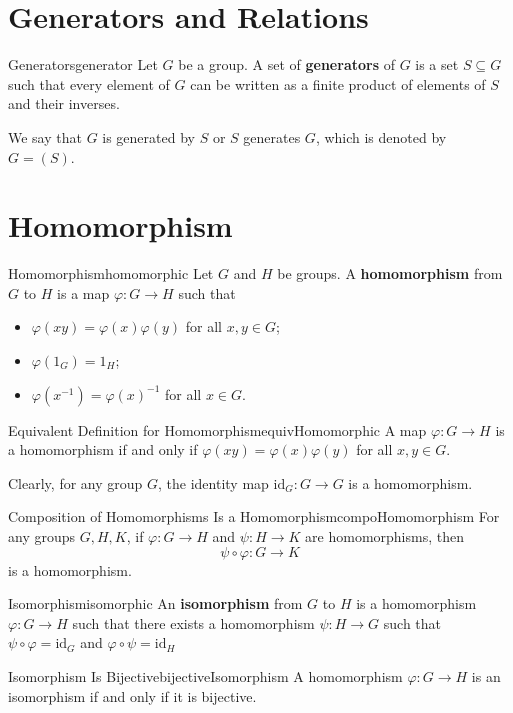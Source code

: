 \documentclass[math, code]{amznotes}
\theoremstyle{remark}
\begin{document}
\section{Generators and Relations}
\begin{dfnbox}{Generators}{generator}
    Let $G$ be a group. A set of {\color{red} \textbf{generators}} of $G$ is a set $S \subseteq G$ such that every element of $G$ can be written as a finite product of elements of $S$ and their inverses.
\end{dfnbox}
We say that $G$ is generated by $S$ or $S$ generates $G$, which is denoted by $G = (S)$.

\section{Homomorphism}
\begin{dfnbox}{Homomorphism}{homomorphic}
    Let $G$ and $H$ be groups. A {\color{red} \textbf{homomorphism}} from $G$ to $H$ is a map $\varphi \colon G \to H$ such that 
    \begin{itemize}
        \item $\varphi(xy) = \varphi(x)\varphi(y)$ for all $x, y \in G$;
        \item $\varphi(1_G) = 1_H$;
        \item $\varphi(x^{-1}) = \varphi(x)^{-1}$ for all $x \in G$.
    \end{itemize}
\end{dfnbox}
\begin{probox}{Equivalent Definition for Homomorphism}{equivHomomorphic}
    A map $\varphi \colon G \to H$ is a homomorphism if and only if $\varphi(xy) = \varphi(x)\varphi(y)$ for all $x, y \in G$.
\end{probox}
Clearly, for any group $G$, the identity map $\mathrm{id}_G\colon G \to G$ is a homomorphism.
\begin{probox}{Composition of Homomorphisms Is a Homomorphism}{compoHomomorphism}
    For any groups $G, H, K$, if $\varphi \colon G \to H$ and $\psi \colon H \to K$ are homomorphisms, then
    \begin{equation*}
        \psi \circ \varphi \colon G \to K
    \end{equation*}
    is a homomorphism.
\end{probox}
\begin{dfnbox}{Isomorphism}{isomorphic}
    An {\color{red} \textbf{isomorphism}} from $G$ to $H$ is a homomorphism $\varphi \colon G \to H$ such that there exists a homomorphism $\psi \colon H \to G$ such that $\psi \circ \varphi = \mathrm{id}_G$ and $\varphi \circ \psi = \mathrm{id}_H$
\end{dfnbox}
\begin{probox}{Isomorphism Is Bijective}{bijectiveIsomorphism}
    A homomorphism $\varphi \colon G \to H$ is an isomorphism if and only if it is bijective.
\end{probox}
\end{document}
